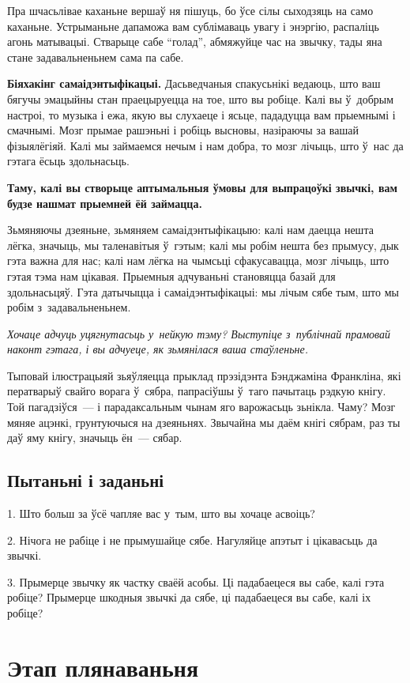 Пра шчасьлівае каханьне вершаў ня пішуць, бо ўсе сілы сыходзяць на само каханьне. Устрыманьне дапаможа вам сублімаваць увагу і энэргію, распаліць агонь матывацыі. Стварыце сабе ``голад'', абмяжуйце час на звычку, тады яна стане задавальненьнем сама па сабе.

\textbf{Біяхакінг самаідэнтыфікацыі.} Дасьведчаныя спакусьнікі ведаюць, што ваш бягучы эмацыйны стан праецыруецца на тое, што вы робіце. Калі вы ў~добрым настроі, то музыка і ежа, якую вы слухаеце і ясьце, пададуцца вам прыемнымі і смачнымі. Мозг прымае рашэньні і робіць высновы, назіраючы за вашай фізыялёгіяй. Калі мы займаемся нечым і нам добра, то мозг лічыць, што ў~нас да гэтага ёсьць здольнасьць.

\textbf{Таму, калі вы створыце аптымальныя ўмовы для выпрацоўкі звычкі, вам будзе нашмат прыемней ёй займацца.}

Зьмяняючы дзеяньне, зьмяняем самаідэнтыфікацыю: калі нам даецца нешта лёгка, значыць, мы таленавітыя ў~гэтым; калі мы робім нешта без прымусу, дык гэта важна для нас; калі нам лёгка на чымсьці сфакусавацца, мозг лічыць, што гэтая тэма нам цікавая. Прыемныя адчуваньні становяцца базай для здольнасьцяў. Гэта датычыцца і самаідэнтыфікацыі: мы лічым сябе тым, што мы робім з~задавальненьнем.

\emph{Хочаце адчуць уцягнутасьць у~нейкую тэму? Выступіце з~публічнай прамовай наконт гэтага, і вы адчуеце, як зьмянілася ваша стаўленьне.}

Тыповай ілюстрацыяй зьяўляецца прыклад прэзідэнта Бэнджаміна Франкліна, які ператварыў свайго ворага ў~сябра, папрасіўшы ў~таго пачытаць рэдкую кнігу. Той пагадзіўся~--- і парадаксальным чынам яго варожасьць зьнікла. Чаму? Мозг мяняе ацэнкі, грунтуючыся на дзеяньнях. Звычайна мы даём кнігі сябрам, раз ты даў яму кнігу, значыць ён~--- сябар.

\subsection*{Пытаньні і заданьні}

1. Што больш за ўсё чапляе вас у~тым, што вы хочаце асвоіць?

2. Нічога не рабіце і не прымушайце сябе. Нагуляйце апэтыт і цікавасьць да звычкі.

3. Прымерце звычку як частку сваёй асобы. Ці падабаецеся вы сабе, калі гэта робіце? Прымерце шкодныя звычкі да сябе, ці падабаецеся вы сабе, калі іх робіце?


\section{Этап плянаваньня}

